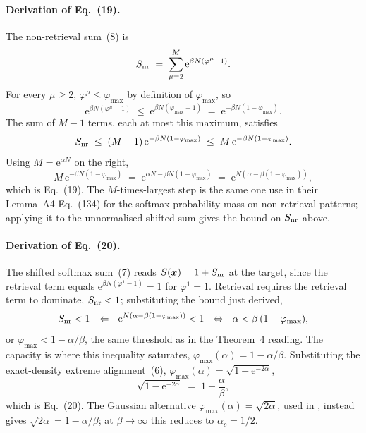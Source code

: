 \documentclass[letterpaper]{article} %
\newcommand{\e}{{\mathrm{e}}}
\newcommand{\Bnet}{\beta}
\newcommand{\ac}{\alpha_c}
\begin{document}
\paragraph{Derivation of Eq.~(19).}
The non-retrieval sum~(8) is
\begin{equation*}
S_{\rm nr} \;=\; \sum_{\mu = 2}^M \e^{\Bnet N (\varphi^\mu - 1)}.
\end{equation*}
For every $\mu \geq 2$, $\varphi^\mu \leq \varphi_{\max}$ by
definition of $\varphi_{\max}$, so
\begin{equation*}
\e^{\Bnet N (\varphi^\mu - 1)} \;\leq\; \e^{\Bnet N (\varphi_{\max} - 1)}
   \;=\; \e^{-\Bnet N (1-\varphi_{\max})}.
\end{equation*}
The sum of $M - 1$ terms, each at most this maximum, satisfies
\begin{equation*}
S_{\rm nr} \;\leq\; (M-1)\,\e^{-\Bnet N (1-\varphi_{\max})}
   \;\leq\; M\,\e^{-\Bnet N (1-\varphi_{\max})}.
\end{equation*}
Using $M = \e^{\alpha N}$ on the right,
\begin{equation*}
M\,\e^{-\Bnet N (1-\varphi_{\max})}
   \;=\; \e^{\alpha N - \Bnet N (1-\varphi_{\max})}
   \;=\; \e^{N(\alpha - \Bnet(1-\varphi_{\max}))},
\end{equation*}
which is Eq.~(19).  The $M$-times-largest step
is the same one \citeauthor{ramsauer2021hopfield} use in their
Lemma~A4 Eq.~(134) for the softmax probability mass on non-retrieval patterns;
applying it to the unnormalised shifted sum gives the bound on
$S_{\rm nr}$ above.

\paragraph{Derivation of Eq.~(20).}
The shifted softmax sum~(7) reads
$S(\bm x) = 1 + S_{\rm nr}$ at the target, since the retrieval
term equals $\e^{\Bnet N(\varphi^1 - 1)} = 1$ for $\varphi^1 = 1$.
Retrieval requires the retrieval term to dominate, $S_{\rm nr} < 1$;
substituting the bound just derived,
\begin{equation*}
S_{\rm nr} < 1 \ \ \Leftarrow\ \ 
\e^{N(\alpha - \Bnet(1-\varphi_{\max}))} < 1
\ \ \Leftrightarrow\ \ 
\alpha < \Bnet\,(1-\varphi_{\max}),
\end{equation*}
or $\varphi_{\max} < 1 - \alpha/\Bnet$, the same threshold as in the
Theorem~4 reading.  The capacity is where this inequality saturates,
$\varphi_{\max}(\alpha) = 1 - \alpha/\Bnet$.  Substituting the
exact-density extreme alignment~(6),
$\varphi_{\max}(\alpha) = \sqrt{1 - \e^{-2\alpha}}$,
\begin{equation*}
\sqrt{1 - \e^{-2\alpha}} \;=\; 1 - \frac{\alpha}{\Bnet},
\end{equation*}
which is Eq.~(20).  The Gaussian alternative
$\varphi_{\max}(\alpha) = \sqrt{2\alpha}$, used in
\citet{icml2026theory}, instead gives
$\sqrt{2\alpha} = 1 - \alpha/\Bnet$; at $\Bnet \to \infty$ this
reduces to $\ac = 1/2$.




\end{document}
